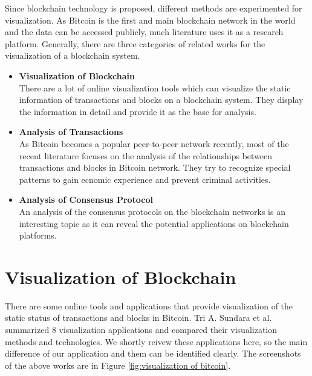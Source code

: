 Since blockchain technology is proposed, different methods are experimented for visualization. As Bitcoin is the first and main blockchain network in the world and the data can be accessed publicly, much literature uses it as a research platform. Generally, there are three categories of related works for the visualization of a blockchain system.
\begin{itemize}
    \item \textbf{Visualization of Blockchain} \\
        There are a lot of online visualization tools which can visualize the static information of transactions and blocks on a blockchain system. They display the information in detail and provide it as the base for analysis.
    \item \textbf{Analysis of Transactions} \\
        As Bitcoin becomes a popular peer-to-peer network recently, most of the recent literature focuses on the analysis of the relationships between transactions and blocks in Bitcoin network. They try to recognize special patterns to gain ecnomic experience and prevent criminal activities.
    \item \textbf{Analysis of Consensus Protocol} \\
        An analysis of the consensus protocols on the blockchain networks is an interesting topic as it can reveal the potential applications on blockchain platforms.
\end{itemize}

\section{Visualization of Blockchain}

There are some online tools and applications that provide visualization of the static status of transactions and blocks in Bitcoin. Tri A. Sundara et al. \cite{Sundara2017} summarized 8 visualization applications and compared their visualization methods and technologies. We shortly reivew these applications here, so the main difference of our application and them can be identified clearly. The screenshots of the above works are in Figure \ref{fig:visualization of bitcoin}.

